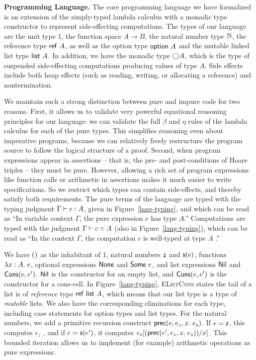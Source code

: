 \documentclass[preprint,natbib]{sigplanconf}
\begin{document}
\textbf{Programming Language.} The core programming language we have
formalized is an extension of the simply-typed lambda calculus with a
monadic type constructor to represent side-effecting computations.
The types of our language are the unit type $1$, the function space $A
\to B$, the natural number type $\mathbb{N}$, the reference type
$\mbox{\textsf{{ref }}}A$, as well as the option type $\mbox{\textsf{{option }}}{A}$ and the
mutable linked list type $\mbox{\textsf{{list }}}{A}$. In addition, we have the
monadic type $\bigcirc{A}$, which is the type of suspended
side-effecting computations producing values of type $A$. Side effects
include both heap effects (such as reading, writing, or allocating a
reference) and nontermination.

We maintain such a strong distinction between pure and impure code for
two reasons. First, it allows us to validate very powerful equational
reasoning principles for our language: we can validate the full
$\beta$ and $\eta$ rules of the lambda calculus for each of the pure
types. This simplifies reasoning even about imperative programs,
because we can relatively freely restructure the program source to
follow the logical structure of a proof. Second, when program
expressions appear in assertions -- that is, the pre- and
post-conditions of Hoare triples -- they must be pure. However,
allowing a rich set of program expressions like function calls or
arithmetic in assertions makes it much easier to write
specifications. So we restrict which types can contain side-effects,
and thereby satisfy both requirements.
%
The pure terms of the language are typed with the typing judgment
${\Gamma} \vdash {e} : {A}$, given in Figure~\ref{lang-typing}, and which
can be read as ``In variable context $\Gamma$, the pure expression $e$
has type $A$.'' Computations are typed with the judgment
${\Gamma} \vdash {c} \div {A}$ (also in Figure~\ref{lang-typing}), which can
be read as ``In the context $\Gamma$, the computation $c$ is
well-typed at type $A$ .''

We have $()$ as the inhabitant of $1$, natural numbers $\mbox{\textsf{{z}}}$ and
$\mbox{\textsf{{s}}}(e)$, functions $\lambda x:A.\;e$, optional expressions
$\mbox{\textsf{{None}}}$ and $\mbox{\textsf{{Some }}}e$, and list expressions
$\mbox{\textsf{{Nil}}}$ and $\mbox{\textsf{{Cons}}}(e,e')$. $\mbox{\textsf{{Nil}}}$ is the
constructor for an empty list, and $\mbox{\textsf{{Cons}}}(e, e')$ is the
constructor for a cons-cell.  In Figure~\ref{lang-typing},
\textsc{EListCons} states the tail of a list is of \emph{reference} type
$\mbox{\textsf{{ref }}}\mbox{\textsf{{list }}}{A}$, which means that our list type is a type of
\emph{mutable} lists. We also have the corresponding eliminations for
each type, including case statements for option types and list
types. For the natural numbers, we add a primitive recursion construct
$\mbox{\textsf{{prec}}}(e, {e_z}, x.\; {e_s})$. If $e = \mbox{\textsf{{z}}}$, this computes $e_z$ , and if $e
= \mbox{\textsf{{s}}}(e')$, it computes $e_s[(\mbox{\textsf{{prec}}}(e', {e_z}, x.\; {e_s}))/x]$.  This
bounded iteration allows us to implement (for example) arithmetic
operations as pure expressions.
\end{document}
